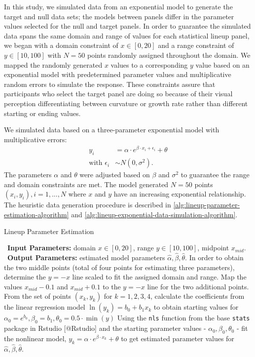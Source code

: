 \documentclass[12pt]{article}
\begin{document}
In this study, we simulated data from an exponential model to generate
the target and null data sets; the models between panels differ in the
parameter values selected for the null and target panels. In order to
guarantee the simulated data spans the same domain and range of values
for each statistical lineup panel, we began with a domain constraint of
\(x\in [0,20]\) and a range constraint of \(y\in [10,100]\) with
\(N = 50\) points randomly assigned throughout the domain. We mapped the
randomly generated \(x\) values to a corresponding \(y\) value based on
an exponential model with predetermined parameter values and
multiplicative random errors to simulate the response. These constraints
assure that participants who select the target panel are doing so
because of their visual perception differentiating between curvature or
growth rate rather than different starting or ending values.

We simulated data based on a three-parameter exponential model with
multiplicative errors: \begin{align}
y_i & = \alpha\cdot e^{\beta\cdot x_i + \epsilon_i} + \theta \\
\text{with } \epsilon_i & \sim N(0, \sigma^2). \nonumber
\end{align} The parameters \(\alpha\) and \(\theta\) were adjusted based
on \(\beta\) and \(\sigma^2\) to guarantee the range and domain
constraints are met. The model generated \(N = 50\) points
\((x_i, y_i), i = 1,...,N\) where \(x\) and \(y\) have an increasing
exponential relationship. The heuristic data generation procedure is
described in \cref{alg:lineup-parameter-estimation-algorithm} and
\cref{alg:lineup-exponential-data-simulation-algorithm}.

\begin{algorithm}
  \caption{Lineup Parameter Estimation}\label{alg:lineup-parameter-estimation-algorithm}
  \begin{algorithmic}[1]
    \Statex \hspace*{-1em}\textbullet~\textbf{Input Parameters:} domain $x\in[0,20]$, range $y\in[10,100]$, midpoint $x_{mid}$.
    \Statex \hspace*{-1em}\textbullet~\textbf{Output Parameters:} estimated model parameters $\hat\alpha, \hat\beta, \hat\theta$.
    \State In order to obtain the two middle points (total of four points for estimating three parameters), determine the $y=-x$ line scaled to fit the assigned domain and range.
    \State Map the values $x_{mid} - 0.1$ and $x_{mid} + 0.1$ to the $y=-x$ line for the two additional points.
    \State From the set of points $(x_k, y_k)$ for $k = 1,2,3,4$, calculate the coefficients from the linear regression model $\ln(y_k) = b_0 +b_1x_k$ to obtain starting values for $\alpha_0 = e^{b_0}, \beta_0 =  b_1, \theta_0 = 0.5\cdot \min(y)$
    \State Using the \texttt{nls} function from the base \texttt{stats} package in Rstudio [@Rstudio] and the starting parameter values - $\alpha_0, \beta_0, \theta_0$ - fit the nonlinear model, $y_k = \alpha\cdot e^{\beta\cdot x_k}+\theta$ to get estimated parameter values for $\hat\alpha, \hat\beta, \hat\theta.$
  \end{algorithmic}
\end{algorithm}
\end{document}
